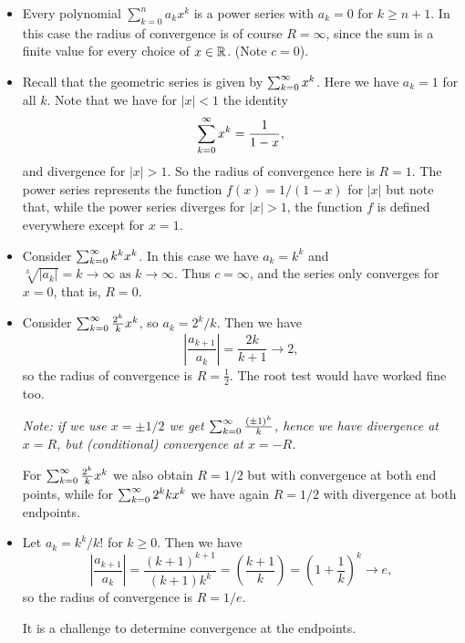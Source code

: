 \documentclass[10pt, a4paper]{article}
\newcommand{\limas}[3][n]{#2 \rightarrow #3 \text{ as } #1 \rightarrow \infty}
\newcommand{\infsumo}{\infsum[k = 0]}
\begin{document}
\begin{example}\phantom{}
    \begin{itemize}
        \item Every polynomial $\sum_{k = 0}^{n}a_kx ^ k$ is a power series with $a_k = 0$ for $k \geq n + 1$.
        In this case the radius of convergence is of course $R = \infty$,
        since the sum is a finite value for every choice of $x \in \mathbb{R}$.
        (Note $c = 0$).

        \item Recall that the geometric series is given by $\infsumo x ^ k$.
        Here we have $a_k = 1$ for all $k$.
        Note that we have for $|x| < 1$ the identity
        \[
        \infsumo x ^ k = \frac{1}{1 - x},
        \]
        and divergence for $|x| > 1$.
        So the radius of convergence here is $R = 1$.
        The power series represents the function $f(x) = 1 / (1 - x)$ for $|x|$ but note that,
        while the power series diverges for $|x| > 1$,
        the function $f$ is defined everywhere except for $x = 1$.

        \item Consider $\infsumo k ^ kx ^ k$.
        In this case we have $a_k = k ^ k$ and $\limas[k]{\sqrt[k]{|a_k|} = k}{\infty}$.
        Thus $c = \infty$,
        and the series only converges for $x = 0$,
        that is,
        $R = 0$.

        \item Consider $\infsumo\frac{2 ^ k}{k}x ^ k$,
        so $a_k = 2 ^ k / k$.
        Then we have
        \[
        \left|\frac{a_{k + 1}}{a_k}\right| = \frac{2k}{k + 1} \rightarrow 2,
        \]
        so the radius of convergence is $R = \frac{1}{2}$.
        The root test would have worked fine too.
        
        \textit{Note: if we use $x = \pm 1 / 2$ we get $\infsumo\frac{(\pm 1) ^ k}{k}$,
        hence we have divergence at $x = R$,
        but
        (conditional)
        convergence at $x = -R$.}

        For $\infsumo\frac{2 ^ k}{k}x ^ k$ we also obtain $R = 1 / 2$ but with convergence at both end points,
        while for $\infsumo 2 ^ kk x ^ k$ we have again $R = 1 / 2$ with divergence at both endpoints.
        
        \item Let $a_k = k ^ k / k!$ for $k \geq 0$.
        Then we have
        \[
        \left|\frac{a_{k + 1}}{a_k}\right| = \frac{(k + 1) ^ {k + 1}}{(k + 1)k ^ k} = \left(\frac{k + 1}{k}\right) = \left(1 + \frac{1}{k}\right) ^ k \rightarrow e,
        \]
        so the radius of convergence is $R = 1 / e$.
        
        It is a challenge to determine convergence at the endpoints.
    \end{itemize}
\end{example}
\end{document}
